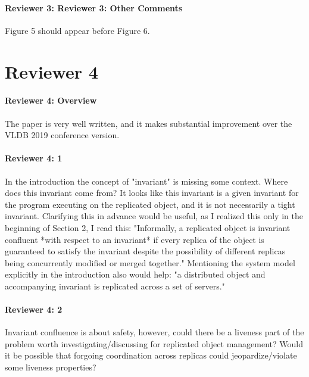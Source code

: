 \documentclass[9pt]{article}
\begin{document}
\begin{multicols*}{2}
\paragraph{Reviewer 3: Reviewer 3: Other Comments}
\begin{feedback}
  Figure 5 should appear before Figure 6.
\end{feedback}

\section*{Reviewer 4}
\paragraph{Reviewer 4: Overview}
\begin{feedback}
  The paper is very well written, and it makes substantial improvement over the
  VLDB 2019 conference version.
\end{feedback}

\paragraph{Reviewer 4: 1}
\begin{feedback}
  In the introduction the concept of "invariant" is missing some context. Where
  does this invariant come from? It looks like this invariant is a given
  invariant for the program executing on the replicated object, and it is not
  necessarily a tight invariant.  Clarifying this in advance would be useful,
  as I realized this only in the beginning of Section 2, I read this:
  "Informally, a replicated object is invariant confluent *with respect to an
  invariant* if every replica of the object is guaranteed to satisfy the
  invariant despite the possibility of different replicas being concurrently
  modified or merged together." Mentioning the system model explicitly in the
  introduction also would help: "a distributed object and accompanying
  invariant is replicated across a set of servers."
\end{feedback}

\paragraph{Reviewer 4: 2}
\begin{feedback}
  Invariant confluence is about safety, however, could there be a liveness part
  of the problem worth investigating/discussing for replicated object
  management? Would it be possible that forgoing coordination across replicas
  could jeopardize/violate some liveness properties?
\end{feedback}


\end{multicols*}
\end{document}
